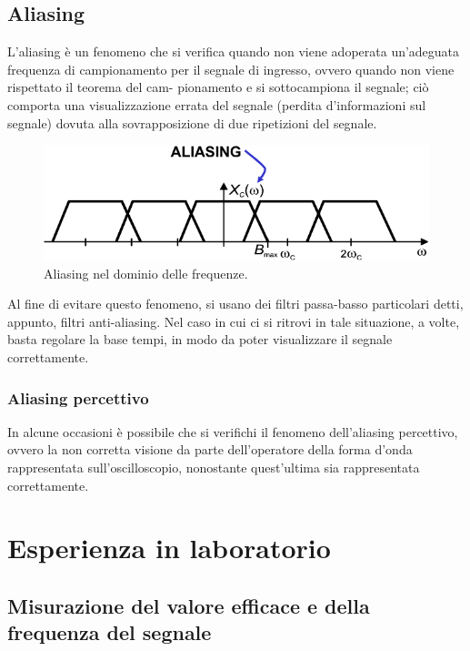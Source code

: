 \documentclass{article}
\begin{document}
		\subsection{Aliasing}
			L’aliasing è un fenomeno che si verifica quando non viene adoperata un’adeguata frequenza di campionamento per il segnale di ingresso, ovvero quando non viene rispettato il teorema del cam-
			\newline
			pionamento e si sottocampiona il segnale; ciò comporta una visualizzazione errata del segnale (perdita d'informazioni sul segnale) dovuta alla sovrapposizione di due ripetizioni del segnale.
			\begin{figure}[h!]
				\centering
				\includegraphics[scale=0.4]{aliasing}
				\caption{Aliasing nel dominio delle frequenze.}
				\label{fig:aliasing}
			\end{figure}
			\newpage
			Al fine di evitare questo fenomeno, si usano dei filtri passa-basso particolari detti, appunto, filtri anti-aliasing. Nel caso in cui ci si ritrovi in tale situazione, a volte, basta regolare la base tempi, in modo da poter visualizzare il segnale correttamente.
			\subsubsection{Aliasing percettivo}
				In alcune occasioni è possibile che si verifichi il fenomeno dell’aliasing percettivo, ovvero la non corretta visione da parte dell’operatore della forma d’onda rappresentata sull’oscilloscopio, nonostante quest’ultima sia rappresentata correttamente.
	\section{Esperienza in laboratorio}
		\subsection{Misurazione del valore efficace e della frequenza del segnale}
\end{document}
